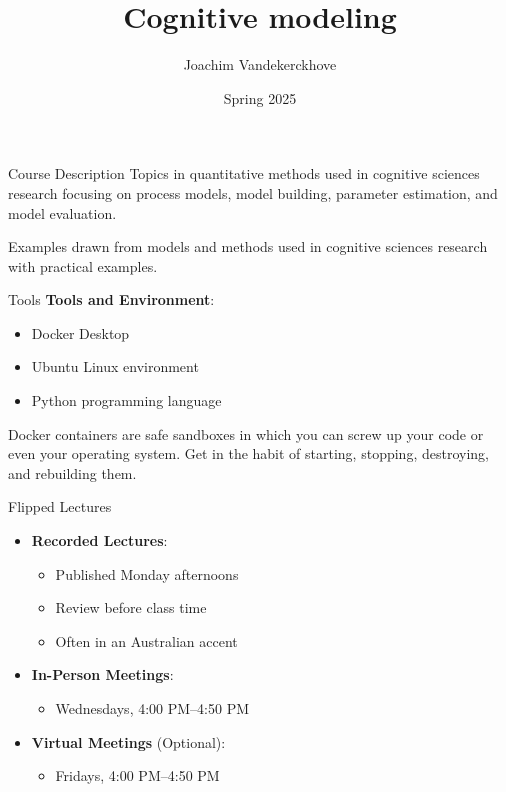 \documentclass[aspectratio=169]{beamer}
\title{Cognitive modeling}
\author{Joachim Vandekerckhove}
\date{Spring 2025}
\begin{document}
\maketitle
\begin{frame}{Course Description}
Topics in quantitative methods used in cognitive sciences research focusing on process models, model building, parameter estimation, and model evaluation. 

Examples drawn from models and methods used in cognitive sciences research with practical examples.
\end{frame}

\begin{frame}{Tools}
\textbf{Tools and Environment}:
\begin{itemize}[<+->]
    \item Docker Desktop
    \item Ubuntu Linux environment
    \item Python programming language
\end{itemize}\pause
Docker containers are safe sandboxes in which you can screw up your code or even your operating system.  Get in the habit of starting, stopping, destroying, and rebuilding them.
\end{frame}


\begin{frame}{Flipped Lectures}
\begin{itemize}[<+->]
\item[]
\textbf{Recorded Lectures}:
\begin{itemize}
    \item Published Monday afternoons
    \item Review before class time
    \item Often in an Australian accent
\end{itemize}
\item[]
\textbf{In-Person Meetings}:
\begin{itemize}
    \item Wednesdays, 4:00 PM--4:50 PM
\end{itemize}
\item[]
\textbf{Virtual Meetings} (Optional):
\begin{itemize}
    \item Fridays, 4:00 PM--4:50 PM
\end{itemize}
\end{itemize}
\end{frame}
\end{document}
